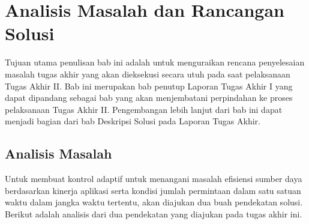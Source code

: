 \chapter{Analisis Masalah dan Rancangan Solusi}

Tujuan utama penulisan bab ini adalah untuk menguraikan rencana penyelesaian masalah tugas akhir yang akan dieksekusi secara utuh pada saat pelaksanaan Tugas Akhir II. Bab ini merupakan bab penutup Laporan Tugas Akhir I yang dapat dipandang sebagai bab yang akan menjembatani perpindahan ke proses pelaksanaan Tugas Akhir II. Pengembangan lebih lanjut dari bab ini dapat menjadi bagian dari bab Deskripsi Solusi pada Laporan Tugas Akhir.

\section{Analisis Masalah}


Untuk membuat kontrol adaptif untuk menangani masalah efisiensi sumber daya berdasarkan kinerja aplikasi serta kondisi jumlah permintaan dalam satu satuan waktu dalam jangka waktu tertentu, akan diajukan dua buah pendekatan solusi. Berikut adalah analisis dari dua pendekatan yang diajukan pada tugas akhir ini.





